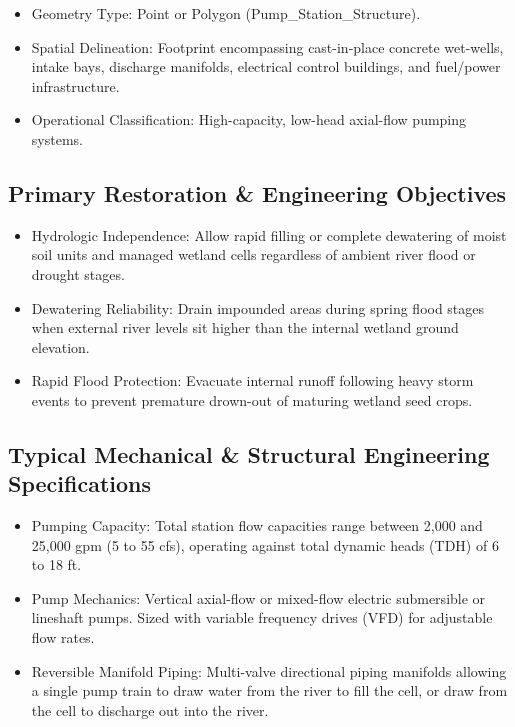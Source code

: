 \documentclass[
  letterpaper,
  DIV=11,
  numbers=noendperiod]{scrreprt}
\begin{document}
\begin{itemize}
\item
  Geometry Type: Point or Polygon (Pump\_Station\_Structure).
\item
  Spatial Delineation: Footprint encompassing cast-in-place concrete
  wet-wells, intake bays, discharge manifolds, electrical control
  buildings, and fuel/power infrastructure.
\item
  Operational Classification: High-capacity, low-head axial-flow pumping
  systems.
\end{itemize}

\subsection{Primary Restoration \& Engineering
Objectives}\label{primary-restoration-engineering-objectives-9}

\begin{itemize}
\item
  Hydrologic Independence: Allow rapid filling or complete dewatering of
  moist soil units and managed wetland cells regardless of ambient river
  flood or drought stages.
\item
  Dewatering Reliability: Drain impounded areas during spring flood
  stages when external river levels sit higher than the internal wetland
  ground elevation.
\item
  Rapid Flood Protection: Evacuate internal runoff following heavy storm
  events to prevent premature drown-out of maturing wetland seed crops.
\end{itemize}

\subsection{Typical Mechanical \& Structural Engineering
Specifications}\label{typical-mechanical-structural-engineering-specifications}

\begin{itemize}
\item
  Pumping Capacity: Total station flow capacities range between 2,000
  and 25,000 gpm (5 to 55 cfs), operating against total dynamic heads
  (TDH) of 6 to 18 ft.
\item
  Pump Mechanics: Vertical axial-flow or mixed-flow electric submersible
  or lineshaft pumps. Sized with variable frequency drives (VFD) for
  adjustable flow rates.
\item
  Reversible Manifold Piping: Multi-valve directional piping manifolds
  allowing a single pump train to draw water from the river to fill the
  cell, or draw from the cell to discharge out into the river.
\end{itemize}
\end{document}
